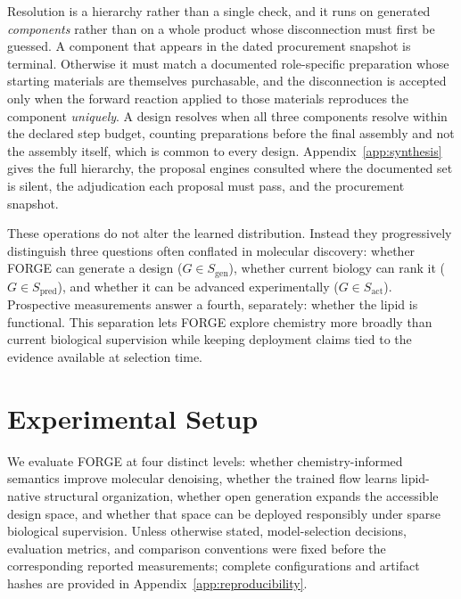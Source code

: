 \documentclass{article}
\newcommand{\Sgen}{\ensuremath{S_{\mathrm{gen}}}}
\newcommand{\Spred}{\ensuremath{S_{\mathrm{pred}}}}
\newcommand{\Sact}{\ensuremath{S_{\mathrm{act}}}}
\begin{document}
Resolution is a hierarchy rather than a single check, and it runs on generated \emph{components}
rather than on a whole product whose disconnection must first be guessed. A component that appears in
the dated procurement snapshot is terminal. Otherwise it must match a documented role-specific
preparation whose starting materials are themselves purchasable, and the disconnection is accepted
only when the forward reaction applied to those materials reproduces the component \emph{uniquely}.
A design resolves when all three components resolve within the declared step budget, counting
preparations before the final assembly and not the assembly itself, which is common to every design.
Appendix~\ref{app:synthesis} gives the full hierarchy, the proposal engines consulted where the
documented set is silent, the adjudication each proposal must pass, and the procurement snapshot.

These operations do not alter the learned distribution. Instead they progressively distinguish three
questions often conflated in molecular discovery: whether FORGE can generate a design
($G \in \Sgen$), whether current biology can rank it ($G \in \Spred$), and whether it can be advanced
experimentally ($G \in \Sact$). Prospective measurements answer a fourth, separately: whether the
lipid is functional. This separation lets FORGE explore chemistry more broadly than current biological
supervision while keeping deployment claims tied to the evidence available at selection time.


\section{Experimental Setup}
We evaluate FORGE at four distinct levels: whether chemistry-informed semantics improve molecular
denoising, whether the trained flow learns lipid-native structural organization, whether open
generation expands the accessible design space, and whether that space can be deployed responsibly
under sparse biological supervision. Unless otherwise stated, model-selection decisions, evaluation
metrics, and comparison conventions were fixed before the corresponding reported measurements;
complete configurations and artifact hashes are provided in Appendix~\ref{app:reproducibility}.
\end{document}
